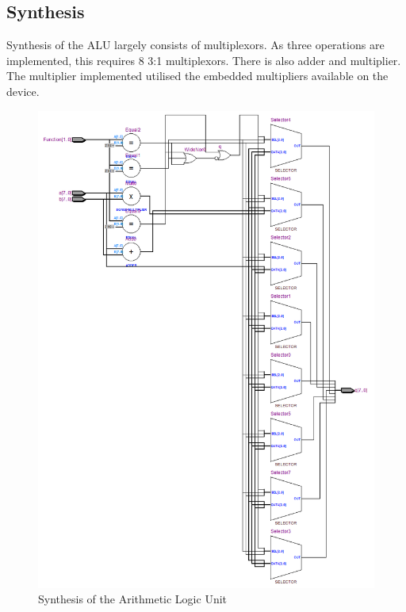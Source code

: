 \subsection{Synthesis}

Synthesis of the ALU largely consists of multiplexors. 
As three operations are implemented, this requires 8 3:1 multiplexors. 
There is also adder and multiplier. 
The multiplier implemented utilised the embedded multipliers available on the device.

\begin{figure}
\includegraphics[height=\textheight]{Figures/alusynth.png}
\caption{Synthesis of the Arithmetic Logic Unit}
\label{fig:alusynth}
\end{figure}
